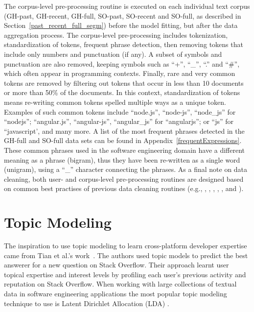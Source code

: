         The corpus-level pre-processing routine is executed on each individual text corpus (GH-past, GH-recent, GH-full, SO-past, SO-recent and SO-full, as described in Section~\ref{past_recent_full_segm}) before the model fitting, but after the data aggregation process. The corpus-level pre-processing includes tokenization, standardization of tokens, frequent phrase detection, then removing tokens that include only numbers and punctuation (if any). A subset of symbols and punctuation are also removed, keeping symbols such as ``+'', ``\_'', ``.'' and ``\#'', which often appear in programming contexts. Finally, rare and very common tokens are removed by filtering out tokens that occur in less than 10 documents or more than 50\% of the documents. In this context, standardization of tokens means re-writing common tokens spelled multiple ways as a unique token. Examples of such common tokens include ``node.js'', ``node-js'', ``node\_js'' for ``nodejs''; ``angular.js'', ``angular-js'', ``angular\_js'' for ``angularjs''; or ``js'' for ``javascript', and many more. A list of the most frequent phrases detected in the GH-full and SO-full data sets can be found in Appendix~\ref{frequentExpressions}. These common phrases used in the software engineering domain have a different meaning as a phrase (bigram), thus they have been re-written as a single word (unigram), using a ``\_'' character connecting the phrases. As a final note on data cleaning, both user- and corpus-level pre-processing routines are designed based on common best practises of previous data cleaning routines (e.g., \cite{tian2013predicting}, \cite{campbell2015latent}, \cite{treude2019predicting}, \cite{efstathiou2018word}, \cite{boyd2014care}, and \cite{liao2019status}).

\section{Topic Modeling\label{sec:topic_modeling}}

    The inspiration to use topic modeling to learn cross-platform developer expertise came from Tian et al.'s work~\cite{tian2013predicting}. The authors used topic models to predict the best answerer for a new question on Stack Overflow. Their approach learnt user topical expertise and interest levels by profiling each user's previous activity and reputation on Stack Overflow. When working with large collections of textual data in software engineering applications the most popular topic modeling technique to use is Latent Dirichlet Allocation (LDA) \cite{campbell2015latent}. 
    
